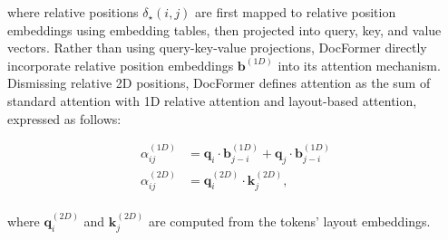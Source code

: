     
\noindent where relative positions $\delta_{\star}(i, j)$ are first mapped to relative position embeddings using embedding tables, then projected into query, key, and value vectors. Rather than using query-key-value projections, DocFormer directly incorporate relative position embeddings $\bm{b}^{(1D)}$ into its attention mechanism. Dismissing relative 2D positions, DocFormer defines attention as the sum of standard attention with 1D relative attention and layout-based attention, expressed as follows:

\begin{equation}
    \begin{aligned}
        \alpha^{(1D)}_{ij} &= \bm{q}_i \cdot \bm{b}^{(1D)}_{j-i} + \bm{q}_j \cdot \bm{b}^{(1D)}_{j-i} \\
        \alpha^{(2D)}_{ij} &= \bm{q}^{(2D)}_i \cdot \bm{k}^{(2D)}_j, \\
\end{aligned}
\label{equation:docformer-attention}
\end{equation}

\noindent where $\bm{q}^{(2D)}_i$ and $\bm{k}^{(2D)}_j$ are computed from the tokens' layout embeddings. 


